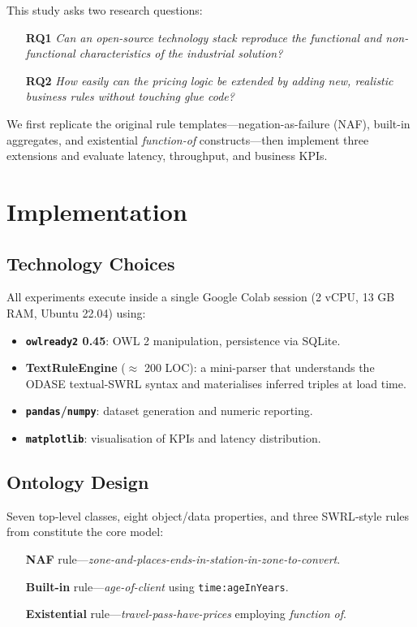 \documentclass[lettersize,journal]{IEEEtran}
\begin{document}
This study asks two research questions:

\begin{enumerate}
\item[\textbf{RQ1}] \textit{Can an open-source technology stack reproduce the functional and non-functional characteristics of the industrial solution?}
\item[\textbf{RQ2}] \textit{How easily can the pricing logic be extended by adding new, realistic business rules without touching glue code?}
\end{enumerate}

We first replicate the original rule templates—negation-as-failure (NAF), built-in aggregates, and existential \emph{function-of} constructs—then implement three extensions and evaluate latency, throughput, and business KPIs.

\section{Implementation}
\subsection{Technology Choices}
All experiments execute inside a single Google Colab session (2 vCPU, 13 GB RAM, Ubuntu 22.04) using:

\begin{itemize}
\item \textbf{\texttt{owlready2} 0.45}: OWL 2 manipulation, persistence via SQLite.
\item \textbf{TextRuleEngine} ($\approx$ 200 LOC): a mini-parser that understands the ODAS\!E textual-SWRL syntax and materialises inferred triples at load time.
\item \textbf{\texttt{pandas}/\texttt{numpy}}: dataset generation and numeric reporting.
\item \textbf{\texttt{matplotlib}}: visualisation of KPIs and latency distribution.
\end{itemize}

\subsection{Ontology Design}
Seven top-level classes, eight object/data properties, and three SWRL‐style rules from \cite{ruleml24} constitute the core model:

\begin{itemize}
\item[\textbullet] \textbf{NAF} rule—\textit{zone-and-places-ends-in-station‐in-zone-to-convert}.  
\item[\textbullet] \textbf{Built-in} rule—\textit{age-of-client} using \texttt{time:ageInYears}.  
\item[\textbullet] \textbf{Existential} rule—\textit{travel-pass-have-prices} employing \emph{function of}.  
\end{itemize}
\end{document}
